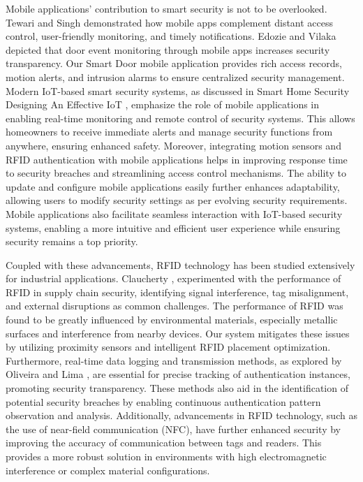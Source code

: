 \documentclass[a4paper]{scrartcl}
\begin{document}
Mobile applications' contribution to smart security is not to be overlooked. Tewari and Singh \cite{Tewari2021} demonstrated how mobile apps complement distant access control, user-friendly monitoring, and timely notifications. Edozie and Vilaka \cite{Edozie2020} depicted that door event monitoring through mobile apps increases security transparency. Our Smart Door mobile application provides rich access records, motion alerts, and intrusion alarms to ensure centralized security management. Modern IoT-based smart security systems, as discussed in Smart Home Security Designing An Effective IoT \cite{SmartHomeSecurity2024}, emphasize the role of mobile applications in enabling real-time monitoring and remote control of security systems. This allows homeowners to receive immediate alerts and manage security functions from anywhere, ensuring enhanced safety. Moreover, integrating motion sensors and RFID authentication with mobile applications helps in improving response time to security breaches and streamlining access control mechanisms. The ability to update and configure mobile applications easily further enhances adaptability, allowing users to modify security settings as per evolving security requirements. Mobile applications also facilitate seamless interaction with IoT-based security systems, enabling a more intuitive and efficient user experience while ensuring security remains a top priority.




Coupled with these advancements, RFID technology has been studied extensively for industrial applications. Claucherty  \cite{Claucherty2025}, experimented with the performance of RFID in supply chain security, identifying signal interference, tag misalignment, and external disruptions as common challenges. The performance of RFID was found to be greatly influenced by environmental materials, especially metallic surfaces and interference from nearby devices. Our system mitigates these issues by utilizing proximity sensors and intelligent RFID placement optimization. Furthermore, real-time data logging and transmission methods, as explored by Oliveira and Lima \cite{Oliveira2023}, are essential for precise tracking of authentication instances, promoting security transparency. These methods also aid in the identification of potential security breaches by enabling continuous authentication pattern observation and analysis. Additionally, advancements in RFID technology, such as the use of near-field communication (NFC), have further enhanced security by improving the accuracy of communication between tags and readers. This provides a more robust solution in environments with high electromagnetic interference or complex material configurations.
\end{document}

